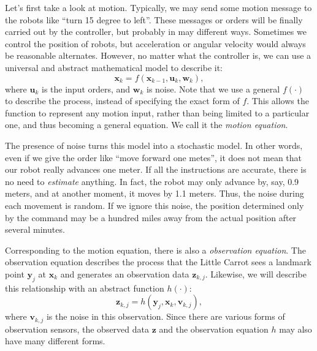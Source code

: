 Let's first take a look at motion. Typically, we may send some motion message to the robots like ``turn 15 degree to left''. These messages or orders will be finally carried out by the controller, but probably in may different ways. Sometimes we control the position of robots, but acceleration or angular velocity would always be reasonable alternates. However, no matter what the controller is, we can use a universal and abstract mathematical model to describe it:
\begin{equation}
{\mathbf{x}_k} = f\left( {{\mathbf{x}_{k - 1}},{\mathbf{u}_k}, \mathbf{w}_k} \right),
\end{equation}
where $\mathbf{u}_k$ is the input orders, and $\mathbf{w}_k$ is noise. Note that we use a general $f(\cdot)$ to describe the process, instead of specifying the exact form of $f$. This allows the function to represent any motion input, rather than being limited to a particular one, and thus becoming a general equation. We call it the \emph{motion equation}.

The presence of noise turns this model into a stochastic model. In other words, even if we give the order like ``move forward one metes'', it does not mean that our robot really advances one meter. If all the instructions are accurate, there is no need to \emph{estimate} anything. In fact, the robot may only advance by, say, 0.9 meters, and at another moment, it moves by 1.1 meters. Thus, the noise during each movement is random. If we ignore this noise, the position determined only by the command may be a hundred miles away from the actual position after several minutes.

Corresponding to the motion equation, there is also a \emph{observation equation}. The observation equation describes the process that the Little Carrot sees a landmark point $\mathbf{y}_j$ at $\mathbf{x}_k$ and generates an observation data $\mathbf{z}_{k,j}$. Likewise, we will describe this relationship with an abstract function $h(\cdot)$:
\begin{equation}
{\mathbf{z}_{k,j}} = h\left( {{\mathbf{y}_j},{\mathbf{x}_k}, \mathbf{v}_{k,j} } \right),
\end{equation}
where $\mathbf{v}_{k,j}$ is the noise in this observation. Since there are various forms of observation sensors, the observed data $\mathbf{z}$ and the observation equation $h$ may also have many different forms.

